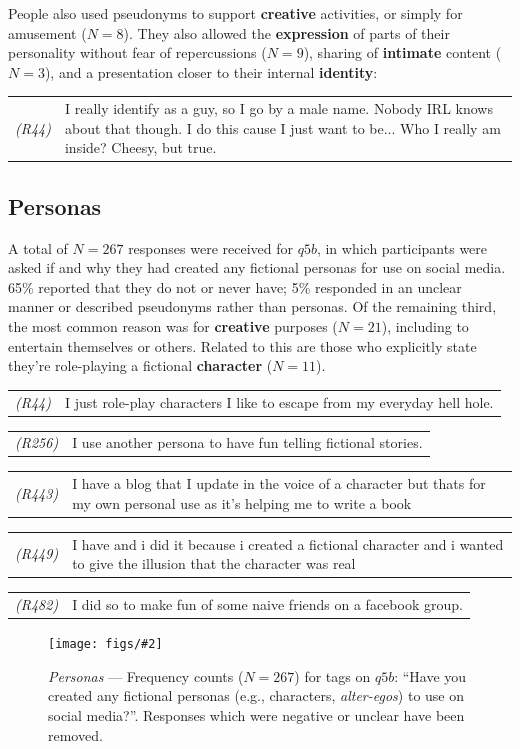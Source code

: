 \documentclass{sig-alternate}
\newcommand{\fig}[3][1.0]{
\begin{figure}[tbp]
\begin{center}
\texttt{[image: figs/\#2]}
\protect\caption{#3}
\label{fig:#2}
\end{center}
\end{figure}
}
\newcommand{\stag}[1]{\textbf{#1}}
\newcommand{\example}[2]{%

\vspace{0.10cm}

\hspace{-3.9ex} \begin{tabular}{ p{0.6cm} p{7.15cm} }
    {\it \small (R#1)} & #2 \\
\end{tabular}%
\vspace{0.10cm}

}
\begin{document}
People also used pseudonyms to support \stag{creative} activities, or simply for amusement ($N=8$). They also allowed the \stag{expression} of parts of their personality without fear of repercussions ($N=9$), sharing of \stag{intimate} content ($N=3$), and a presentation closer to their internal \stag{identity}:
\example{44}{I really identify as a guy, so I go by a male name.
Nobody IRL knows about that though.
I do this cause I just want to be... Who I really am inside?
Cheesy, but true.}



\subsection{Personas}
\label{sec:personas}

A total of $N=267$ responses were received for $q5b$, in which participants were asked if and why they had created any fictional personas for use on social media. 65\% reported that they do not or never have; 5\% responded in an unclear manner or described pseudonyms rather than personas. Of the remaining third, the most common reason was for \stag{creative} purposes ($N=21$), including to entertain themselves or others. Related to this are those who explicitly state they're role-playing a fictional \stag{character} ($N=11$).

\example{44}{I just role-play characters I like to escape from my everyday hell hole.}

\example{256}{I use another persona to have fun telling fictional stories.}

\example{443}{I have a blog that I update in the voice of a character but thats for my own personal use as it's helping me to write a book}

\example{449}{I have and i did it because i created a fictional character and i wanted to give the illusion that the character was real}

\example{482}{I did so to make fun of some naive friends on a facebook group.}


\fig{q5bfrequency}{\emph{Personas} --- Frequency counts ($N=267$) for tags on $q5b$: ``Have you created any fictional personas (e.g., characters, \emph{alter-egos}) to use on social media?''. Responses which were negative or unclear have been removed.}
\end{document}
